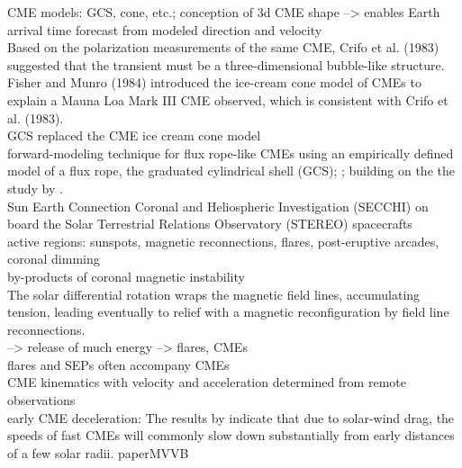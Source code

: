 CME models: GCS, cone, etc.; conception of 3d CME shape --> enables Earth arrival time forecast from modeled direction and velocity\\
Based on the polarization measurements of the same CME, Crifo et al. (1983) suggested that the transient must be a three-dimensional bubble-like structure. Fisher and Munro (1984) introduced the ice-cream cone model of CMEs to explain a Mauna Loa Mark III CME observed, which is consistent with Crifo et al. (1983).\\
GCS replaced the CME ice cream cone model\\
forward-modeling technique for flux rope-like CMEs using an empirically defined model of a flux rope, the graduated cylindrical shell (GCS); \citep{Thernisien2006}; building on the the study by \citet{Cremades2004}.\\
Sun Earth Connection Coronal and Heliospheric Investigation (SECCHI) on board the Solar Terrestrial Relations Observatory (STEREO) spacecrafts \citep{Howard2008}\\


active regions: sunspots, magnetic reconnections, flares, post-eruptive arcades, coronal dimming\\
by-products of coronal magnetic instability\\
The solar differential rotation wraps the magnetic field lines, accumulating tension, leading eventually to relief with a magnetic reconfiguration by field line reconnections.\\
--> release of much energy --> flares, CMEs\\
flares and SEPs often accompany CMEs\\


CME kinematics with velocity and acceleration determined from remote observations\\
early CME deceleration: The results by \citet{Sachdeva2017} indicate that due to solar-wind drag, the speeds of fast CMEs will commonly slow down substantially from early distances of a few solar radii. paperMVVB\\


